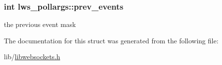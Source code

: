 \subsubsection[{\texorpdfstring{prev\+\_\+events}{prev\_events}}]{\setlength{\rightskip}{0pt plus 5cm}int lws\+\_\+pollargs\+::prev\+\_\+events}\hypertarget{structlws__pollargs_a437fec0de5cf264371e1ab5a401e86d8}{}\label{structlws__pollargs_a437fec0de5cf264371e1ab5a401e86d8}
the previous event mask 

The documentation for this struct was generated from the following file\+:\begin{DoxyCompactItemize}
\item 
lib/\hyperlink{libwebsockets_8h}{libwebsockets.\+h}\end{DoxyCompactItemize}
